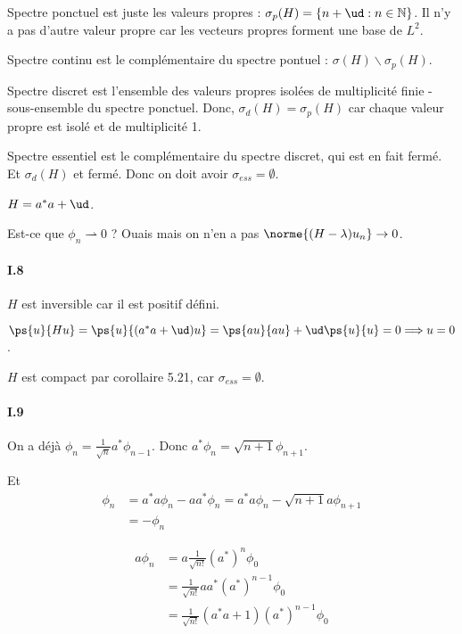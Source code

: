 Spectre ponctuel est juste les valeurs propres :
$\sigma_p(H) = \{n + \ud : n \in \mathbb{N} \}$. Il n'y a
pas d'autre valeur propre car les vecteurs propres forment
une base de $L^2$.

Spectre continu est le complémentaire du spectre pontuel :
$\sigma(H) \backslash \sigma_p(H) $.

Spectre discret est l’ensemble des valeurs propres isolées de
multiplicité finie - sous-ensemble du spectre ponctuel. Donc,
$\sigma_d(H) = \sigma_p(H)$ car chaque valeur propre est isolé
et de multiplicité 1.

Spectre essentiel est le complémentaire du spectre discret,
qui est en fait fermé. Et $\sigma_d(H)$ et fermé. Donc on doit
avoir $\sigma_{ess} = \emptyset$.


$H = a^* a + \ud$.

Est-ce que $\phi_n \rightharpoonup 0$ ? Ouais mais on n'en a pas
$\norme{(H - \lambda) u_n} \rightarrow 0$.


\newpage

\paragraph{I.8}

$H$ est inversible car il est positif défini.

$\ps{u}{Hu} = \ps{u}{(a^* a + \ud)u} = \ps{au}{au}
+ \ud \ps{u}{u} = 0 \Longrightarrow u = 0$.

$H$ est compact par corollaire 5.21, car $\sigma_{ess} = \emptyset$.



\paragraph{I.9}




On a déjà $\phi_n = \frac{1}{\sqrt{n}} a^* \phi_{n-1}$.
Donc $a^* \phi_n = \sqrt{n+1} \phi_{n+1}$.

Et
\begin{align}
    [a^*, a]\phi_n &= a^* a \phi_n - a a^* \phi_n
    = a^* a \phi_n - \sqrt{n+1} a \phi_{n+1} \\
    &= -\phi_n
\end{align}

\begin{align}
    a \phi_n &= a \frac{1}{\sqrt{n!}} (a^*)^n \phi_0 \\
    &= \frac{1}{\sqrt{n!}} a a^* (a^*)^{n-1} \phi_0 \\
    &= \frac{1}{\sqrt{n!}} (a^* a + 1) (a^*)^{n-1} \phi_0
\end{align}

